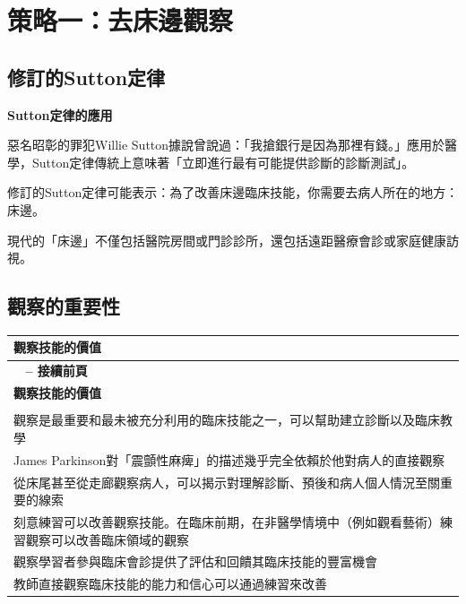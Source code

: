 \documentclass[12pt,a4paper]{article}
\begin{document}
\section{策略一：去床邊觀察}

\subsection{修訂的Sutton定律}

\begin{importantbox}
\textbf{Sutton定律的應用}

惡名昭彰的罪犯Willie Sutton據說曾說過：「我搶銀行是因為那裡有錢。」應用於醫學，Sutton定律傳統上意味著「立即進行最有可能提供診斷的診斷測試」。

修訂的Sutton定律可能表示：為了改善床邊臨床技能，你需要去病人所在的地方：床邊。

現代的「床邊」不僅包括醫院房間或門診診所，還包括遠距醫療會診或家庭健康訪視。
\end{importantbox}

\subsection{觀察的重要性}

\begin{longtable}{>{\raggedright\arraybackslash}p{15cm}}
\toprule
\textbf{\textcolor{emergency_blue}{觀察技能的價值}} \\
\midrule
\endfirsthead

\multicolumn{1}{c}%
{{\bfseries \tablename\ \thetable{} -- 接續前頁}} \\
\toprule
\textbf{\textcolor{emergency_blue}{觀察技能的價值}} \\
\midrule
\endhead

\midrule \multicolumn{1}{r}{{接續下頁}} \\ \midrule
\endfoot

\bottomrule
\endlastfoot

觀察是最重要和最未被充分利用的臨床技能之一，可以幫助建立診斷以及臨床教學 \\

James Parkinson對「震顫性麻痺」的描述幾乎完全依賴於他對病人的直接觀察 \\

從床尾甚至從走廊觀察病人，可以揭示對理解診斷、預後和病人個人情況至關重要的線索 \\

刻意練習可以改善觀察技能。在臨床前期，在非醫學情境中（例如觀看藝術）練習觀察可以改善臨床領域的觀察 \\

觀察學習者參與臨床會診提供了評估和回饋其臨床技能的豐富機會 \\

教師直接觀察臨床技能的能力和信心可以通過練習來改善 \\
\end{longtable}
\end{document}
